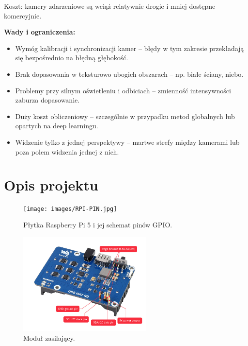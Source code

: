 \documentclass[magisterska]{pracadypl}
\begin{document}
Koszt: kamery zdarzeniowe są wciąż relatywnie drogie i mniej dostępne komercyjnie.

\begin{minipage}[t]{\textwidth}
\textbf{Wady i ograniczenia:}
\begin{itemize}
  \item Wymóg kalibracji i synchronizacji kamer – błędy w tym zakresie przekładają się bezpośrednio na błędną głębokość.

  \item Brak dopasowania w teksturowo ubogich obszarach – np. białe ściany, niebo.

  \item Problemy przy silnym oświetleniu i odbiciach – zmienność intensywności zaburza dopasowanie.

  \item Duży koszt obliczeniowy – szczególnie w przypadku metod globalnych lub opartych na deep learningu.

  \item Widzenie tylko z jednej perspektywy – martwe strefy między kamerami lub poza polem widzenia jednej z nich.
\end{itemize}
\end{minipage}



\section{Opis projektu}

\begin{figure}[H]  %
    \centering  %
    \texttt{[image: images/RPI-PIN.jpg]}  %
    \captionsetup{font=footnotesize}
    \caption[Płytka Raspberry Pi 5 i jej schemat pinów GPIO. https://www.hackatronic.com/wp-content/uploads/2024/03/Raspberry-Pi-5-Pinout--1210x642.jpg]{Płytka Raspberry Pi 5 i jej schemat pinów GPIO.}
\end{figure}

\begin{figure}[H]  %
    \centering  %
    \includegraphics[width=0.6\textwidth]{images/ups-hat.jpg}  %
    \captionsetup{font=footnotesize}
    \caption[Moduł zasilający. https://www.waveshare.com/wiki/UPS-HAT-(B)]{Moduł zasilający.}
\end{figure}
\end{document}
